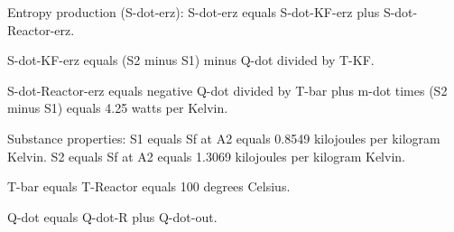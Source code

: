 Entropy production (S-dot-erz):  
S-dot-erz equals S-dot-KF-erz plus S-dot-Reactor-erz.  

S-dot-KF-erz equals (S2 minus S1) minus Q-dot divided by T-KF.  

S-dot-Reactor-erz equals negative Q-dot divided by T-bar plus m-dot times (S2 minus S1) equals 4.25 watts per Kelvin.  

Substance properties:  
S1 equals Sf at A2 equals 0.8549 kilojoules per kilogram Kelvin.  
S2 equals Sf at A2 equals 1.3069 kilojoules per kilogram Kelvin.  

T-bar equals T-Reactor equals 100 degrees Celsius.  

Q-dot equals Q-dot-R plus Q-dot-out.